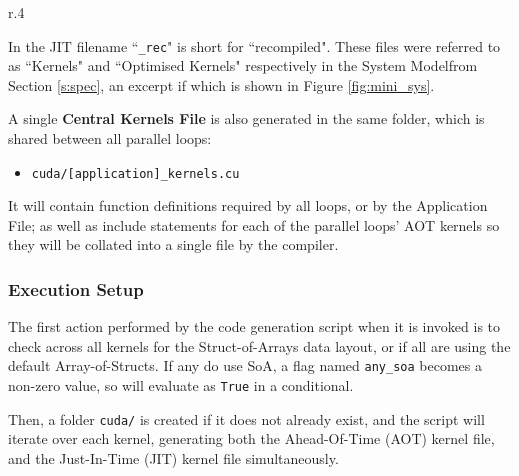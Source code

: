 \begin{wrapfigure}[5]{r}{.4\textwidth}
  \vspace{-1cm}
  \caption{\label{fig:mini_sys}Subsection of System Diagram}
\end{wrapfigure}
\noindent In the JIT filename ``\verb|_rec|" is short for ``recompiled". These files were referred to as ``Kernels" and ``Optimised Kernels" respectively in the System Modelfrom Section \ref{s:spec}, an excerpt if which is shown in Figure \ref{fig:mini_sys}.

\clearpage
A single \textbf{Central Kernels File} is also generated in the same folder, which is shared between all parallel loops:
\begin{itemize}
\vspace{-.5em}
\item{\verb|cuda/[application]_kernels.cu|}
\end{itemize}
It will contain function definitions required by all loops, or by the Application File; as well as include statements for each of the parallel loops' AOT kernels so they will be collated into a single file by the compiler.

\subsubsection{Execution Setup}
The first action performed by the code generation script when it is invoked is to check across all kernels for the Struct-of-Arrays data layout, or if all are using the default Array-of-Structs. If any do use SoA, a flag named \verb|any_soa| becomes a non-zero value, so will evaluate as \verb|True| in a conditional.
\par Then, a folder \verb|cuda/| is created if it does not already exist, and the script will iterate over each kernel, generating both the Ahead-Of-Time (AOT) kernel file, and the Just-In-Time (JIT) kernel file simultaneously.

